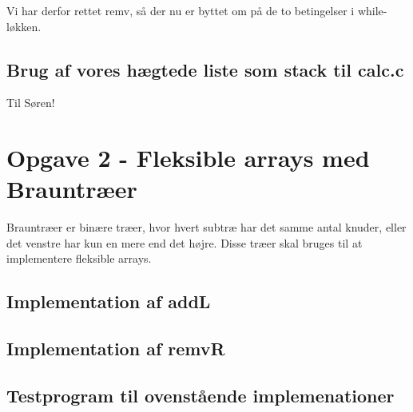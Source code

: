 \documentclass[10pt,a4paper,danish]{article}
\begin{document}
Vi har derfor rettet remv, så der nu er byttet om på de to betingelser i while-løkken.

\subsection{Brug af vores hægtede liste som stack til calc.c}
Til Søren!

\section{Opgave 2 - Fleksible arrays med Brauntræer}
Brauntræer er binære træer, hvor hvert subtræ har det samme antal knuder, eller det venstre har kun en mere end det højre. Disse træer skal bruges til at implementere fleksible arrays.

\subsection{Implementation af addL}

\subsection{Implementation af remvR}

\subsection{Testprogram til ovenstående implemenationer}
\end{document}
